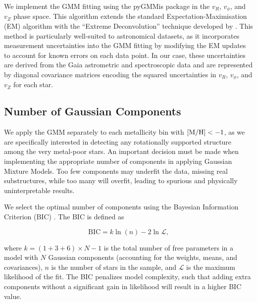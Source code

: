 \documentclass[a4paper,12pt]{article}
\begin{document}
We implement the GMM fitting using the pyGMMis package \citep{pygmmis} in the $v_R$, $v_\phi$, and $v_Z$
phase space. This algorithm extends the standard 
Expectation-Maximisation (EM) algorithm with the ``Extreme Deconvolution'' technique developed by 
\citet{Bovy2011}. This method is particularly well-suited to astronomical datasets, as it incorporates 
measurement uncertainties into the GMM fitting by modifying the EM updates to account for known errors 
on each data point. In our case, these uncertainties are derived from the Gaia astrometric and 
spectroscopic data and are represented by diagonal covariance matrices encoding the squared uncertainties 
in $v_R$, $v_\phi$, and $v_Z$ for each star.


\subsection{Number of Gaussian Components}
\label{subsec:n_components}

We apply the GMM separately to each metallicity bin with ${\rm [M/H]} < -1$, as we are specifically 
interested in detecting any rotationally supported structure among the very metal-poor stars. An important decision 
must be made when implementing the appropriate number of components in applying Gaussian Mixture Models. Too few 
components may underfit the data, missing real substructures, while too many will overfit, leading to spurious 
and physically uninterpretable results.

We select the optimal number of components using the Bayesian Information Criterion (BIC) \citealt{Schwarz1978}. 
The BIC is defined as

\begin{equation}
\mathrm{BIC} = k \ln(n) - 2 \ln \mathcal{L},
\end{equation}

where $k = (1 + 3 + 6) \times N - 1$ is the total number of free parameters in a model with $N$ Gaussian components 
(accounting for the weights, means, and covariances), $n$ is the number of stars in the sample, and $\mathcal{L}$ 
is the maximum likelihood of the fit. The BIC penalizes model complexity, such that adding extra components 
without a significant gain in likelihood will result in a higher BIC value.
\end{document}
